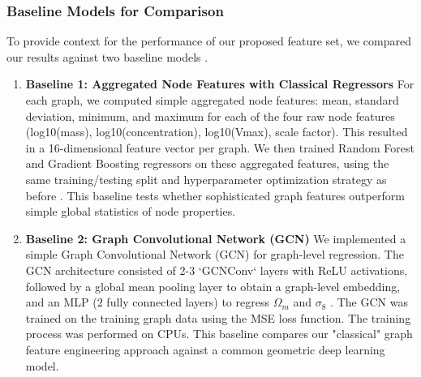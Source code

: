 \documentclass[twocolumn]{aastex631}
\begin{document}
\subsubsection{Baseline Models for Comparison}
To provide context for the performance of our proposed feature set, we compared our results against two baseline models \citep{pan2024astromlab2astrollama270bmodel,dehaan2025astromlab3achievinggpt4o}.
\begin{enumerate}
    \item \textbf{Baseline 1: Aggregated Node Features with Classical Regressors}
For each graph, we computed simple aggregated node features: mean, standard deviation, minimum, and maximum for each of the four raw node features (log10(mass), log10(concentration), log10(Vmax), scale factor). This resulted in a 16-dimensional feature vector per graph. We then trained Random Forest and Gradient Boosting regressors on these aggregated features, using the same training/testing split and hyperparameter optimization strategy as before \citep{soo2023machinelearningapplicationsastrophysics}. This baseline tests whether sophisticated graph features outperform simple global statistics of node properties.
    \item \textbf{Baseline 2: Graph Convolutional Network (GCN)}
We implemented a simple Graph Convolutional Network (GCN) for graph-level regression. The GCN architecture consisted of 2-3 `GCNConv` layers with ReLU activations, followed by a global mean pooling layer to obtain a graph-level embedding, and an MLP (2 fully connected layers) to regress $\Omega_m$ and $\sigma_8$ \citep{zhong2024improvingconvolutionalneuralnetworks,kvasiuk2024reconstructioncontinuouscosmologicalfields}. The GCN was trained on the training graph data using the MSE loss function. The training process was performed on CPUs. This baseline compares our "classical" graph feature engineering approach against a common geometric deep learning model.
\end{enumerate}
\end{document}
